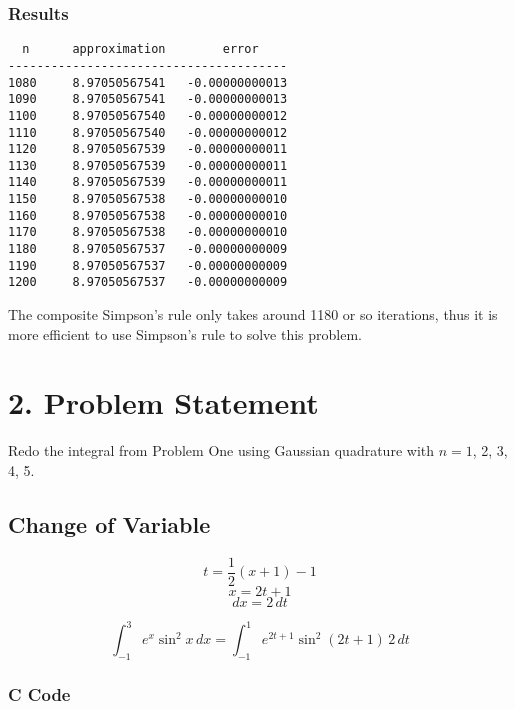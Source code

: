 \documentclass{article}
\begin{document}
\subsubsection*{Results}
\begin{verbatim}
  n      approximation        error
---------------------------------------
1080     8.97050567541   -0.00000000013 
1090     8.97050567541   -0.00000000013 
1100     8.97050567540   -0.00000000012 
1110     8.97050567540   -0.00000000012 
1120     8.97050567539   -0.00000000011 
1130     8.97050567539   -0.00000000011 
1140     8.97050567539   -0.00000000011 
1150     8.97050567538   -0.00000000010 
1160     8.97050567538   -0.00000000010 
1170     8.97050567538   -0.00000000010 
1180     8.97050567537   -0.00000000009 
1190     8.97050567537   -0.00000000009 
1200     8.97050567537   -0.00000000009 
\end{verbatim}
The composite Simpson's rule only takes around 1180 or so iterations, thus
it is more efficient to use Simpson's rule to solve this problem.



\section*{2.  Problem Statement}
Redo the integral from Problem One using Gaussian quadrature with $n = 1$, 2,
3, 4, 5.

\subsection*{Change of Variable}
$$
t = \frac{1}{2} (x + 1) - 1
$$
$$
x = 2t + 1
$$
$$
dx = 2 \, dt
$$

$$
\int_{-1}^{3} e^x \sin^2{x} \, dx = 
   \int_{-1}^{1} e^{2t + 1} \sin^2{(2t + 1)} \, 2\, dt
$$
\subsubsection*{C Code}
\end{document}
